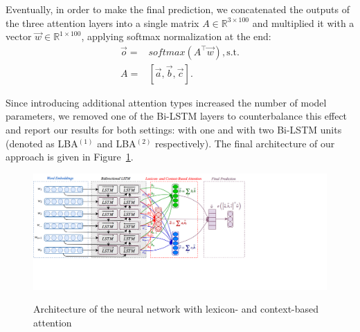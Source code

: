 Eventually, in order to make the final prediction, we concatenated the
outputs of the three attention layers into a single matrix
$A\in\mathbb{R}^{3 \times 100}$ and multiplied it with a vector
$\vec{w}\in\mathbb{R}^{1\times 100}$, applying softmax normalization
at the end:
\begin{align*}
  \vec{o} =& softmax\left(A^\top\vec{w}\right), \textrm{s.t.}\\
  A =& [\vec{a}, \vec{b}, \vec{c}].
\end{align*}

Since introducing additional attention types increased the number of
model parameters, we removed one of the Bi-LSTM layers to
counterbalance this effect and report our results for both settings:
with one and with two Bi-LSTM units (denoted as LBA$^{(1)}$ and
LBA$^{(2)}$ respectively).  The final architecture of our approach is
given in Figure~\ref{cgsa:fig:lba}.



\begin{figure}[htbp!]
{ \centering \includegraphics[width=1.3\linewidth]{img/lba.png} }
\caption[Neural network with lexicon-based attention]{Architecture of
  the neural network with lexicon- and context-based
  attention}\label{cgsa:fig:lba}
\end{figure}



